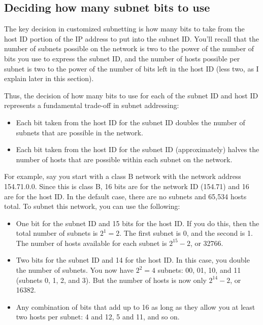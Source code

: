\subsection{Deciding how many subnet bits to use}

The key decision in customized subnetting is how many bits to take from
the host ID portion of the IP address to put into the subnet ID.
You'll recall that the number of subnets
possible on the network is two to the power of the number of bits you
use to express the subnet ID, and the number of hosts possible per
subnet is two to the power of the number of bits left in the host ID
(less two, as I explain later in this section).

Thus, the decision of how many bits to use for each of the subnet ID and
host ID represents a fundamental trade-off in subnet addressing:

\begin{itemize}
\item
  Each bit taken from the host ID for the subnet ID doubles the number
  of subnets that are possible in the network.
\item
  Each bit taken from the host ID for the subnet ID (approximately)
  halves the number of hosts that are possible within each subnet on the
  network.
\end{itemize}

For example, say you start with a class B network with the network
address 154.71.0.0. Since this is class B, 16 bits are for the network
ID (154.71) and 16 are for the host ID. In the default case, there are
no subnets and 65,534 hosts total. To subnet this network, you can use
the following:

\begin{itemize}
   \item
      One bit for the subnet ID and 15 bits for the host ID. If you do this,
      then the total number of subnets is $2^{1} = 2$.
      The first subnet is 0, and the second is 1.
      The number of hosts available  for each subnet is $2^{15}-2$, or 32766.
   \item
      Two bits for the subnet ID and 14 for the host ID.
      In this case, you double the number of subnets.
      You now have $2^{2}= 4$ subnets: 00, 01, 10, and 11 (subnets 0, 1, 2, and 3).
      But the number of hosts is now only $2^{14}-2$, or 16382.
   \item
      Any combination of bits that add up to 16 as long as they allow you at least two hosts per subnet: 4 and 12, 5 and 11, and so on.
\end{itemize}

